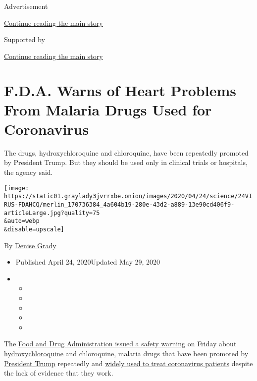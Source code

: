 Advertisement

\protect\hyperlink{after-top}{Continue reading the main story}

Supported by

\protect\hyperlink{after-sponsor}{Continue reading the main story}

\hypertarget{fda-warns-of-heart-problems-from-malaria-drugs-used-for-coronavirus}{%
\section{F.D.A. Warns of Heart Problems From Malaria Drugs Used for
Coronavirus}\label{fda-warns-of-heart-problems-from-malaria-drugs-used-for-coronavirus}}

The drugs, hydroxychloroquine and chloroquine, have been repeatedly
promoted by President Trump. But they should be used only in clinical
trials or hospitals, the agency said.

\texttt{[image: https://static01.graylady3jvrrxbe.onion/images/2020/04/24/science/24VIRUS-FDAHCQ/merlin\_170736384\_4a604b19-280e-43d2-a889-13e90cd406f9-articleLarge.jpg?quality=75\\\&auto=webp\\\&disable=upscale]}

By \href{https://www.nytimes3xbfgragh.onion/by/denise-grady}{Denise
Grady}

\begin{itemize}
\item
  Published April 24, 2020Updated May 29, 2020
\item
  \begin{itemize}
  \item
  \item
  \item
  \item
  \item
  \end{itemize}
\end{itemize}

The \href{https://www.fda.gov/media/137250/download}{Food and Drug
Administration issued a safety warning} on Friday about
\href{https://www.nytimes3xbfgragh.onion/2020/05/29/health/coronavirus-hydroxychloroquine.html}{hydroxychloroquine}
and chloroquine, malaria drugs that have been promoted by
\href{https://www.nytimes3xbfgragh.onion/2020/05/19/us/politics/hydroxychloroquine-trump-coronavirus.html}{President
Trump} repeatedly and
\href{https://www.nytimes3xbfgragh.onion/2020/04/01/health/hydroxychloroquine-coronavirus-malaria.html}{widely
used to treat coronavirus patients} despite the lack of evidence that
they work.

